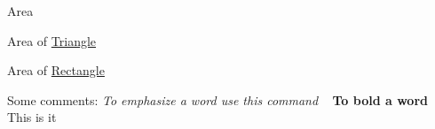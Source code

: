Area
\begin{DoxyItemize}
\item Area of \mbox{\hyperlink{classTriangle}{Triangle}}
\item Area of \mbox{\hyperlink{classRectangle}{Rectangle}}
\end{DoxyItemize}

Some comments\+: {\itshape To emphasize a word use this command} ~\newline
{\bfseries{To bold a word}} ~\newline
~\newline
This is it ~\newline
